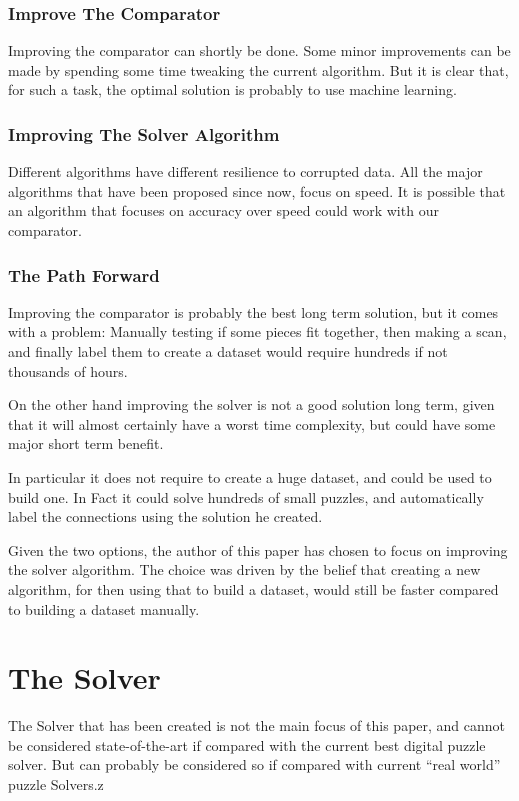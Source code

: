 \documentclass{article}
\begin{document}
\subsubsection{Improve The Comparator}
	
Improving the comparator can shortly be done.
Some minor improvements can be made by spending some time tweaking the current algorithm.
But it is clear that, for such a task,
the optimal solution is probably to use machine learning.

\subsubsection{Improving The Solver Algorithm}

Different algorithms have different resilience to corrupted data.
All the major algorithms that have been proposed since now, focus on speed.
It is possible that an algorithm that focuses on accuracy over speed
could work with our comparator.

\subsubsection{The Path Forward}

Improving the comparator is probably the best long term solution,
but it comes with a problem:\newline
Manually testing if some pieces fit together, then making a scan, and finally label
them to create a dataset would require hundreds if not thousands of hours.

On the other hand improving the solver is not a good solution long term,
given that it will almost certainly have a worst time complexity,
but could have some major short term benefit.

In particular it does not require to create a huge dataset,
and could be used to build one.
In Fact it could solve hundreds of small puzzles,
and automatically label the connections using the solution he created.

Given the two options, the author of this paper has chosen to focus on improving
the solver algorithm. The choice was driven by the belief that creating a new algorithm,
for then using that to build a dataset,
would still be faster compared to building a dataset manually.

\section{The Solver}
The Solver that has been created is not the main focus of this paper,
and cannot be considered state-of-the-art if compared with the current best
digital puzzle solver. But can probably be considered so if compared with current
``real world'' puzzle Solvers.z
\end{document}
